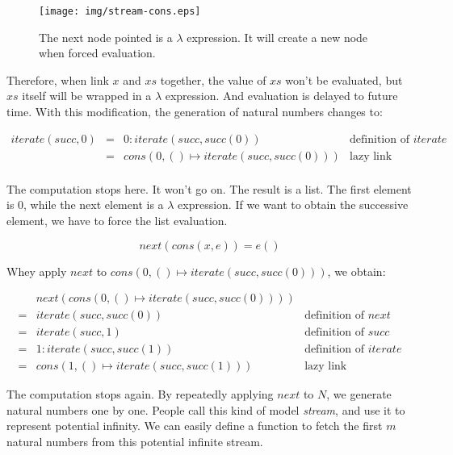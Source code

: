 \documentclass{article}
\begin{document}
\begin{figure}[htbp]
 \centering
 \texttt{[image: img/stream-cons.eps]}
 \caption{The next node pointed is a $\lambda$ expression. It will create a new node when forced evaluation.}
 \label{fig:stream-cons}
\end{figure}

Therefore, when link $x$ and $xs$ together, the value of $xs$ won't be evaluated, but $xs$ itself will be wrapped in a $\lambda$ expression. And evaluation is delayed to future time. With this modification, the generation of natural numbers changes to:

\[
\begin{array}{rcll}
iterate(succ, 0) & = & 0 : iterate(succ, succ(0)) & \text{definition of } iterate\\
                 & = & cons(0, () \mapsto iterate(succ, succ(0))) & \text{lazy link} \\
\end{array}
\]

The computation stops here. It won't go on. The result is a list. The first element is 0, while the next element is a $\lambda$ expression. If we want to obtain the successive element, we have to force the list evaluation.

\[
next(cons(x, e)) = e()
\]

Whey apply $next$ to $cons(0, () \mapsto iterate(succ, succ(0)))$, we obtain:

\[
\begin{array}{cll}
  & next(cons(0, () \mapsto iterate(succ, succ(0)))) & \\
= & iterate(succ, succ(0)) & \text{definition of } next\\
= & iterate(succ, 1) & \text{definition of } succ\\
= & 1 : iterate(succ, succ(1)) & \text{definition of } iterate\\
= & cons(1, () \mapsto iterate(succ, succ(1))) & \text{lazy link}
\end{array}
\]

The computation stops again. By repeatedly applying $next$ to $N$, we generate natural numbers one by one. People call this kind of model {\em stream}, and use it to represent potential infinity. We can easily define a function to fetch the first $m$ natural numbers from this potential infinite stream.
\end{document}
